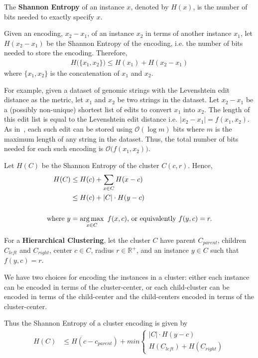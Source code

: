 The \textbf{Shannon Entropy} of an instance $x$, denoted by $H(x)$, is the number of bits needed to exactly specify $x$.

Given an encoding, $x_2 - x_1$, of an instance $x_2$ in terms of another instance $x_1$, let $H(x_2 - x_1)$ be the Shannon Entropy of the encoding, i.e. the number of bits needed to store the encoding.
Therefore,
\begin{align*}
    H \big( \{ x_1, x_2 \} \big) \leq H(x_1) + H(x_2 - x_1)
\end{align*}
where $\{ x_1, x_2 \}$ is the concatenation of $x_1$ and $x_2$.

For example, given a dataset of genomic strings with the Levenshtein edit distance as the metric, let $x_1$ and $x_2$ be two strings in the dataset.
Let $x_2 - x_1$ be a (possibly non-unique) shortest list of edits to convert $x_1$ into $x_2$.
The length of this edit list is equal to the Levenshtein edit distance i.e. $|x_2 - x_1| = f(x_1, x_2)$.
As in~\cite{berger2020levenshtein}, each such edit can be stored using $\mathcal{O}(\log m)$ bits where $m$ is the maximum length of any string in the dataset.
Thus, the total number of bits needed for each such encoding is $\mathcal{O} \big( f(x_1, x_2) \big)$.

Let $H(C)$ be the Shannon Entropy of the cluster $C(c, r)$.
Hence,
\begin{align*}
    H (C) &\leq H(c) + \sum_{x \in C} H(x - c) \\
    &\leq H(c) + |C| \cdot H(y - c) \\ \\
    \text{where} \ y &= \operatorname*{arg\,max}_{x \in C} \ f(x, c) \text{, or equivalently} \ f(y, c) = r.
\end{align*}

For a \textbf{Hierarchical Clustering}, let the cluster $C$ have 
parent $C_{parent}$, 
children $C_{left}$ and $C_{right}$, 
center $c \in C$, 
radius $r \in \mathbb{R}^+$, 
and an instance $y \in C$ such that $f(y, c) = r$.

We have two choices for encoding the instances in a cluster:
either each instance can be encoded in terms of the cluster-center, 
or each child-cluster can be encoded in terms of the child-center and the child-centers encoded in terms of the cluster-center.

Thus the Shannon Entropy of a cluster encoding is given by
\begin{align}
    \label{eq:hierarchical-shannon-entropy}
    H(C) &\leq H(c - c_{parent}) + min \begin{cases}
        |C| \cdot H(y - c) \\
        H(C_{left}) + H(C_{right})
    \end{cases}
\end{align}

